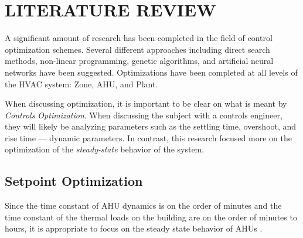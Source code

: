 %
%
%

\chapter{\texorpdfstring{\MakeUppercase{Literature Review}}{Literature Review}}


A significant amount of research has been completed in the field of
control optimization schemes. Several different approaches including
direct search methods, non-linear programming, genetic algorithms, and
artificial neural networks have been suggested. Optimizations have been
completed at all levels of the HVAC system: Zone, AHU, and Plant.  

When discussing optimization, it is important to be clear on what is
meant by \textit{Controls Optimization}. When discussing the subject
with a controls engineer, they will likely be analyzing parameters such
as the settling time, overshoot, and rise time --- dynamic parameters.
In contrast, this research focused more on the optimization of the
\textit{steady-state} behavior of the system. 





\section{Setpoint Optimization}

Since the time constant of AHU dynamics is on the order of minutes and
the time constant of the thermal loads on the building are on the order
of minutes to hours, it is appropriate to focus on the steady state
behavior of AHUs \cite{Bourdouxhe1998}.

